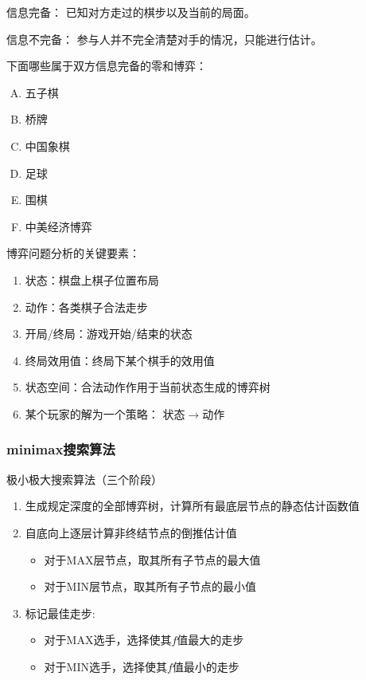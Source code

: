 \begin{note}
    \textcolor{main1}{信息完备：}
    已知对方走过的棋步以及当前的局面。

    \textcolor{main1}{信息不完备：}
    参与人并不完全清楚对手的情况，只能进行估计。
\end{note}

\begin{example}
    下面哪些属于双方信息完备的零和博弈：
    \begin{enumerate}[A.]
        \item \textcolor{main1}{五子棋}
        \item 桥牌
        \item \textcolor{main1}{中国象棋}
        \item \textcolor{main1}{足球}
        \item \textcolor{main1}{围棋}
        \item 中美经济博弈
    \end{enumerate}
\end{example}

博弈问题分析的关键要素：
\begin{enumerate}
    \item 状态：棋盘上棋子位置布局
    \item 动作：各类棋子合法走步
    \item 开局/终局：游戏开始/结束的状态
    \item 终局效用值：终局下某个棋手的效用值
    \item 状态空间：合法动作作用于当前状态生成的博弈树
    \item 某个玩家的\textcolor{main1}{解}为一个\textcolor{main1}{策略}： 状态$\to $动作
\end{enumerate}
\subsubsection{minimax搜索算法}
极小极大搜索算法（三个阶段）
\begin{enumerate}
    \item 生成规定深度的全部博弈树，计算所有最底层节点的静态估计函数值
    \item 自底向上逐层计算非终结节点的倒推估计值
    \begin{itemize}
        \item 对于MAX层节点，取其所有子节点的最大值
        \item 对于MIN层节点，取其所有子节点的最小值
    \end{itemize}
    \item 标记最佳走步:
    \begin{itemize}
        \item 对于MAX选手，选择使其$f$值最大的走步
        \item 对于MIN选手，选择使其$f$值最小的走步
    \end{itemize}
\end{enumerate}

